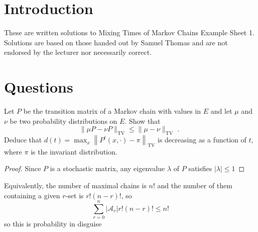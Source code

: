 \documentclass[a4paper]{article}
\begin{document}
	
	
	\section{Introduction}
	These are written solutions to Mixing Times of Markov Chains Example Sheet 1. Solutions are based on those handed out by Samuel Thomas and are not endorsed by the lecturer nor necessarily correct.
	\section{Questions}
	\begin{question}[Question 1]
	Let \(P\) be the transition matrix of a Markov chain with values in \(E\) and let \(\mu\) and \(\nu\) be two
	probability distributions on \(E .\) Show that
$$
\|\mu P-\nu P\|_{\mathrm{TV}} \leq\|\mu-\nu\|_{\mathrm{TV}} \text { . }
$$
Deduce that \(d(t)=\max _{x}\left\|P^{t}(x, \cdot)-\pi\right\|_{\mathrm{TV}}\) is decreasing as a function of \(t,\) where \(\pi\) is the invariant
distribution.
	\end{question}
	
	\begin{proof}
		Since $P$ is a stochastic matrix, any eigenvalue $\lambda$ of $P$ satisfies $|\lambda| \leq 1$
	\end{proof}
	
	\begin{remark}
		Equivalently, the number of maximal chains is \(n!\) and the number of them containing a given \(r\)-set is \(r! (n - r)!\), so
		\[
		\sum_{r = 0}^n |\mathcal A_r| r! (n - r)! \leq n!
		\]
		so this is probability in disguise
	\end{remark}
	
\end{document}
